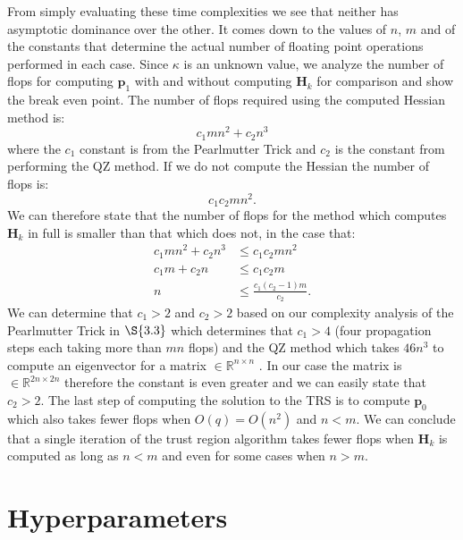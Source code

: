 \documentclass[letterpaper,12pt,titlepage,oneside,final]{book}
\begin{document}
	From simply evaluating these time complexities we see that neither has asymptotic dominance over the other. It comes down to the values of $n$, $m$ and of the constants that determine the actual number of floating point operations performed in each case. Since $\kappa$ is an unknown value, we analyze the number of flops for computing $\mathbf{p}_{1}$ with and without computing $\mathbf{H}_{k}$ for comparison and show the break even point. The number of flops required using the computed Hessian method is:
	\begin{equation}
	c_{1}mn^{2} + c_{2}n^{3}
	\end{equation}
	where the $c_{1}$ constant is from the Pearlmutter Trick and $c_{2}$ is the constant from performing the QZ method. If we do not compute the Hessian the number of flops is:
	\begin{equation}
	c_{1}c_{2}mn^{2}.
	\end{equation}
	We can therefore state that the number of flops for the method which computes $\mathbf{H}_{k}$ in full is smaller than that which does not, in the case that:
	\begin{align}
	c_{1}mn^{2} + c_{2}n^{3}  & \leq c_{1}c_{2}mn^{2} \\
	c_{1}m + c_{2}n & \leq c_{1}c_{2}m \\
	n & \leq \frac{c_{1}(c_{2}-1)m}{c_{2}}.
	\end{align}
	We can determine that $c_{1} > 2$ and $c_{2} > 2$ based on our complexity analysis of the Pearlmutter Trick in $\S{3.3}$ which determines that $c_{1} > 4$ (four propagation steps each taking more than $mn$ flops) and the QZ method which takes $46n^{3}$ to compute an eigenvector for a matrix $\in \mathbb{R}^{n \times n}$ \cite{golub1989matrix}. In our case the matrix is $\in \mathbb{R}^{2n \times 2n}$ therefore the constant is even greater and we can easily state that $c_{2} > 2$.  The last step of computing the solution to the TRS is to compute $\mathbf{p}_{0}$ which also takes fewer flops when $O(q) = O(n^{2})$ and $n < m$. We can conclude that a single iteration of the trust region algorithm takes fewer flops when $\mathbf{H}_{k}$ is computed as long as $n < m$ and even for some cases when $n > m$. 
	
	\chapter{Hyperparameters}
	\label{appendix:hyperparameters}
	
\end{document}

